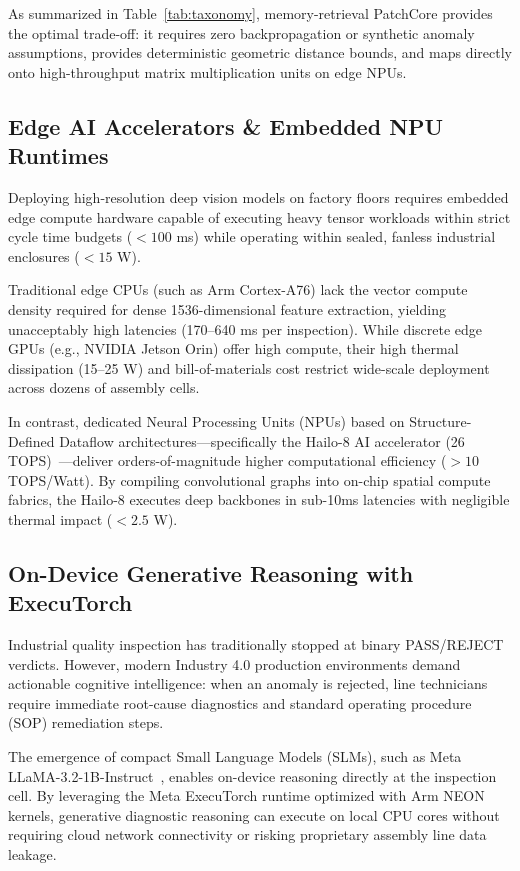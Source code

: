 \documentclass[journal,twocolumn]{IEEEtran}
\begin{document}
As summarized in Table~\ref{tab:taxonomy}, memory-retrieval PatchCore provides the optimal trade-off: it requires zero backpropagation or synthetic anomaly assumptions, provides deterministic geometric distance bounds, and maps directly onto high-throughput matrix multiplication units on edge NPUs.

\subsection{Edge AI Accelerators \& Embedded NPU Runtimes}
Deploying high-resolution deep vision models on factory floors requires embedded edge compute hardware capable of executing heavy tensor workloads within strict cycle time budgets ($<100$ ms) while operating within sealed, fanless industrial enclosures ($<15$ W).

Traditional edge CPUs (such as Arm Cortex-A76) lack the vector compute density required for dense 1536-dimensional feature extraction, yielding unacceptably high latencies (170--640 ms per inspection). While discrete edge GPUs (e.g., NVIDIA Jetson Orin) offer high compute, their high thermal dissipation (15--25 W) and bill-of-materials cost restrict wide-scale deployment across dozens of assembly cells.

In contrast, dedicated Neural Processing Units (NPUs) based on Structure-Defined Dataflow architectures---specifically the Hailo-8 AI accelerator (26 TOPS)~\cite{hailo2023whitepaper}---deliver orders-of-magnitude higher computational efficiency ($>10$ TOPS/Watt). By compiling convolutional graphs into on-chip spatial compute fabrics, the Hailo-8 executes deep backbones in sub-10ms latencies with negligible thermal impact ($<2.5$ W).

\subsection{On-Device Generative Reasoning with ExecuTorch}
Industrial quality inspection has traditionally stopped at binary PASS/REJECT verdicts. However, modern Industry 4.0 production environments demand actionable cognitive intelligence: when an anomaly is rejected, line technicians require immediate root-cause diagnostics and standard operating procedure (SOP) remediation steps.

The emergence of compact Small Language Models (SLMs), such as Meta LLaMA-3.2-1B-Instruct~\cite{meta2024llama3}, enables on-device reasoning directly at the inspection cell. By leveraging the Meta ExecuTorch runtime optimized with Arm NEON kernels, generative diagnostic reasoning can execute on local CPU cores without requiring cloud network connectivity or risking proprietary assembly line data leakage.
\end{document}
